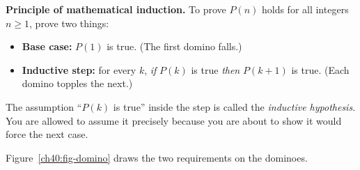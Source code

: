 \begin{focusbox}
\textbf{Principle of mathematical induction.} To prove $P(n)$ holds for all
integers $n \ge 1$, prove two things:
\begin{itemize}
  \item \textbf{Base case:} $P(1)$ is true. (The first domino falls.)
  \item \textbf{Inductive step:} for every $k$, \emph{if} $P(k)$ is true \emph{then}
        $P(k+1)$ is true. (Each domino topples the next.)
\end{itemize}
The assumption ``$P(k)$ is true'' inside the step is called the \emph{inductive
hypothesis}. You are allowed to assume it precisely because you are about to show
it would force the next case.
\end{focusbox}

Figure~\ref{ch40:fig-domino} draws the two requirements on the dominoes.

